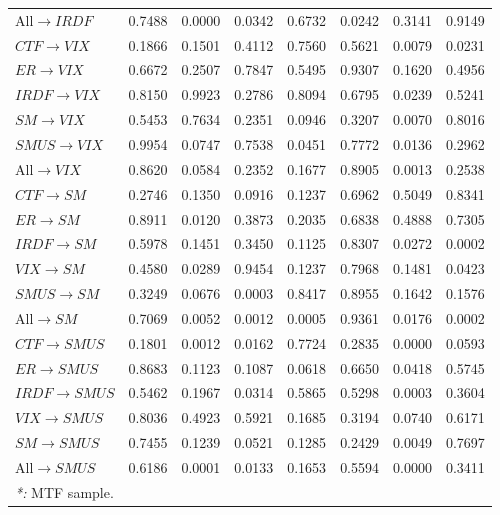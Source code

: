 \documentclass[a4paper, twoside]{templates/ociamthesis}
\begin{document}
\begin{table}[H]
{\begin{tabular}[t]{lccccccc}
All$\rightarrow$$IRDF$ & 0.7488 & 0.0000 & 0.0342 & 0.6732 & 0.0242 & 0.3141 & 0.9149\\
\addlinespace
$CTF$$\rightarrow$$VIX$ & 0.1866 & 0.1501 & 0.4112 & 0.7560 & 0.5621 & 0.0079 & 0.0231\\
$ER$$\rightarrow$$VIX$ & 0.6672 & 0.2507 & 0.7847 & 0.5495 & 0.9307 & 0.1620 & 0.4956\\
$IRDF$$\rightarrow$$VIX$ & 0.8150 & 0.9923 & 0.2786 & 0.8094 & 0.6795 & 0.0239 & 0.5241\\
$SM$$\rightarrow$$VIX$ & 0.5453 & 0.7634 & 0.2351 & 0.0946 & 0.3207 & 0.0070 & 0.8016\\
$SMUS$$\rightarrow$$VIX$ & 0.9954 & 0.0747 & 0.7538 & 0.0451 & 0.7772 & 0.0136 & 0.2962\\
All$\rightarrow$$VIX$ & 0.8620 & 0.0584 & 0.2352 & 0.1677 & 0.8905 & 0.0013 & 0.2538\\
\addlinespace
$CTF$$\rightarrow$$SM$ & 0.2746 & 0.1350 & 0.0916 & 0.1237 & 0.6962 & 0.5049 & 0.8341\\
$ER$$\rightarrow$$SM$ & 0.8911 & 0.0120 & 0.3873 & 0.2035 & 0.6838 & 0.4888 & 0.7305\\
$IRDF$$\rightarrow$$SM$ & 0.5978 & 0.1451 & 0.3450 & 0.1125 & 0.8307 & 0.0272 & 0.0002\\
$VIX$$\rightarrow$$SM$ & 0.4580 & 0.0289 & 0.9454 & 0.1237 & 0.7968 & 0.1481 & 0.0423\\
$SMUS$$\rightarrow$$SM$ & 0.3249 & 0.0676 & 0.0003 & 0.8417 & 0.8955 & 0.1642 & 0.1576\\
All$\rightarrow$$SM$ & 0.7069 & 0.0052 & 0.0012 & 0.0005 & 0.9361 & 0.0176 & 0.0002\\
\addlinespace
$CTF$$\rightarrow$$SMUS$ & 0.1801 & 0.0012 & 0.0162 & 0.7724 & 0.2835 & 0.0000 & 0.0593\\
$ER$$\rightarrow$$SMUS$ & 0.8683 & 0.1123 & 0.1087 & 0.0618 & 0.6650 & 0.0418 & 0.5745\\
$IRDF$$\rightarrow$$SMUS$ & 0.5462 & 0.1967 & 0.0314 & 0.5865 & 0.5298 & 0.0003 & 0.3604\\
$VIX$$\rightarrow$$SMUS$ & 0.8036 & 0.4923 & 0.5921 & 0.1685 & 0.3194 & 0.0740 & 0.6171\\
$SM$$\rightarrow$$SMUS$ & 0.7455 & 0.1239 & 0.0521 & 0.1285 & 0.2429 & 0.0049 & 0.7697\\
All$\rightarrow$$SMUS$ & 0.6186 & 0.0001 & 0.0133 & 0.1653 & 0.5594 & 0.0000 & 0.3411\\
\bottomrule
\multicolumn{8}{l}{\rule{0pt}{1em}\textit{*: } MTF sample. }\\
\end{tabular}}
\end{table}
\end{document}
